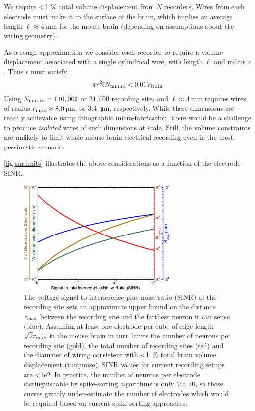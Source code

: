 We require \SI{<1}{\percent} total volume displacement from $N$ recorders.
Wires from each electrode must make it to the surface of the brain, which implies an average length $\ell\approx\SI{4}{\milli\meter}$ for the mouse brain (depending on assumptions about the wiring geometry).

As a rough approximation we consider each recorder to require a volume displacement associated with a single cylindrical wire, with length $\ell$ and radius $r$.
Thus $r$ must satisfy \[\pi r^2\ell N_{\text{\scriptsize min,rd}} < 0.01V_{\text{\scriptsize brain}}\]
Using $N_{\text{\scriptsize min,rd}} = 110,000$ or $21,000$ recording sites and $\ell\approx\SI{4}{\milli\meter}$ requires wires of radius $r_{\text{\scriptsize max}} \approx \SI{8.0}{\micro\meter}$, or \SI{3.4}{\micro\meter}, respectively.
While these dimensions are readily achievable using lithographic micro-fabrication, there would be a challenge to produce \emph{isolated} wires of such dimensions at scale.
Still, the volume constraints are unlikely to limit whole-mouse-brain electrical recording even in the most pessimistic scenario.

\autoref{fig:snrlimits} illustrates the above considerations as a function of the electrode SINR.

\begin{figure}[htbp]
\caption{
The voltage signal to interference-plus-noise ratio (SINR) at the recording site sets an approximate upper bound on the distance $r_{\text{\scriptsize max}}$ between the recording site and the farthest neuron it can sense (blue).
Assuming at least one electrode per cube of edge length $\sqrt{2}r_{\text{\scriptsize max}}$ in the mouse brain in turn limits the number of neurons per recording site (gold), the total number of recording sites (red) and the diameter of wiring consistent with \SI{<1}{\percent} total brain volume displacement (turquoise).
SINR values for current recording setups are \num{<1e2}.
In practice, the number of neurons per electrode distinguishable by spike-sorting algorithms is only \num{\ca 10}, so these curves greatly under-estimate the number of electrodes which would be required based on current spike-sorting approaches.
}
\label{fig:snrlimits}
\centering
\includegraphics[width=0.7\textwidth]{figs/Fig3.eps}
\end{figure}

